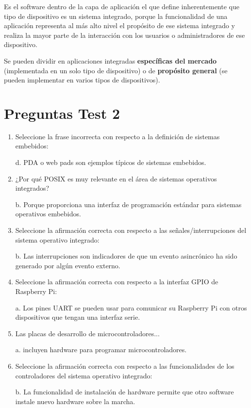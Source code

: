 \documentclass[12pt, twoside, openright]{report} %
\begin{document}
Es el software dentro de la capa de aplicación el que define inherentemente que tipo de dispositivo es un sistema integrado, porque la funcionalidad de una aplicación representa al más alto nivel el propósito de ese sistema integrado y realiza la mayor parte de la interacción con los usuarios o administradores de ese dispositivo.

Se pueden dividir en aplicaciones integradas \textbf{específicas del mercado} (implementada en un solo tipo de dispositivo) o de \textbf{propósito general} (se pueden implementar en varios tipos de dispositivos).
\pagebreak
\section{Preguntas Test 2}
\begin{enumerate}
	\item Seleccione la frase incorrecta con respecto a la definición de sistemas embebidos:

	      d. PDA o web pads son ejemplos típicos de sistemas embebidos.

	\item ¿Por qué POSIX es muy relevante en el área de sistemas operativos integrados?

	      b. Porque proporciona una interfaz de programación estándar para sistemas operativos embebidos.

	\item Seleccione la afirmación correcta con respecto a las señales/interrupciones del sistema operativo integrado:

	      b. Las interrupciones son indicadores de que un evento asincrónico ha sido generado por algún evento externo.

	\item Seleccione la afirmación correcta con respecto a la interfaz GPIO de Raspberry Pi:

	      a. Los pines UART se pueden usar para comunicar su Raspberry Pi con otros dispositivos que tengan una interfaz serie.

	\item Las placas de desarrollo de microcontroladores...

	      a. incluyen hardware para programar microcontroladores.

	\item Seleccione la afirmación correcta con respecto a las funcionalidades de los controladores del sistema operativo integrado:

	      b. La funcionalidad de instalación de hardware permite que otro software instale nuevo hardware sobre la marcha.


\end{enumerate}
\end{document}
